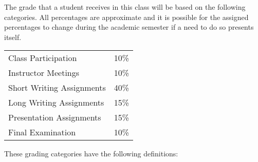 The grade that a student receives in this class will be based on the
following categories. All percentages are approximate and it is possible
for the assigned percentages to change during the academic semester if a
need to do so presents itself. 

% 
% 
% 
% 
% 
% 

\begin{center}
\begin{tabular}{ll}
Class Participation & 10\% \\
Instructor Meetings & 10\% \\
Short Writing Assignments & 40\% \\
Long Writing Assignments & 15\% \\
Presentation Assignments & 15\% \\
Final Examination & 10\%
\end{tabular}
\end{center}

\noindent
\vspace*{-.1in}
These grading categories have the following definitions:

